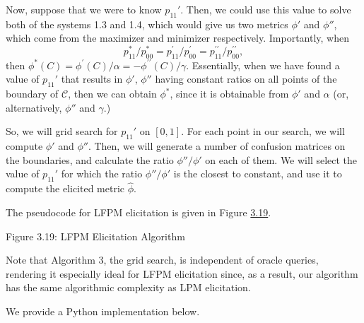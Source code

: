 \documentclass[
  letterpaper,
  numbers=noenddot,
  DIV=11,
  oneside]{scrreprt}
\theoremstyle{remark}
\begin{document}
Now, suppose that we were to know \(p_{11}'\). Then, we could use this
value to solve both of the systems 1.3 and 1.4, which would give us two
metrics \(\phi'\) and \(\phi''\), which come from the maximizer and
minimizer respectively. Importantly, when
\[p_{11}^{*} / p_{00}^{*}=p_{11}^{\prime} / p_{00}^{\prime}=p_{11}^{\prime \prime} / p_{00}^{\prime \prime},\]
then
\(\phi^{*}(C)=\phi^{\prime}(C) / \alpha=-\phi^{\prime \prime}(C) / \gamma\).
Essentially, when we have found a value of \(p_{11}'\) that results in
\(\phi'\), \(\phi''\) having constant ratios on all points of the
boundary of \(\mathcal{C}\), then we can obtain \(\phi^*\), since it is
obtainable from \(\phi'\) and \(\alpha\) (or, alternatively, \(\phi''\)
and \(\gamma\).)

So, we will grid search for \(p_{11}'\) on \([0,1]\). For each point in
our search, we will compute \(\phi'\) and \(\phi''\). Then, we will
generate a number of confusion matrices on the boundaries, and calculate
the ratio \(\phi'' / \phi'\) on each of them. We will select the value
of \(p_{11}'\) for which the ratio \(\phi'' / \phi'\) is the closest to
constant, and use it to compute the elicited metric \(\hat{\phi}\).

The pseudocode for LFPM elicitation is given in Figure
\hyperref[lfpm]{3.19}.

Figure 3.19: LFPM Elicitation Algorithm

Note that Algorithm 3, the grid search, is independent of oracle
queries, rendering it especially ideal for LFPM elicitation since, as a
result, our algorithm has the same algorithmic complexity as LPM
elicitation.

We provide a Python implementation below.
\end{document}
